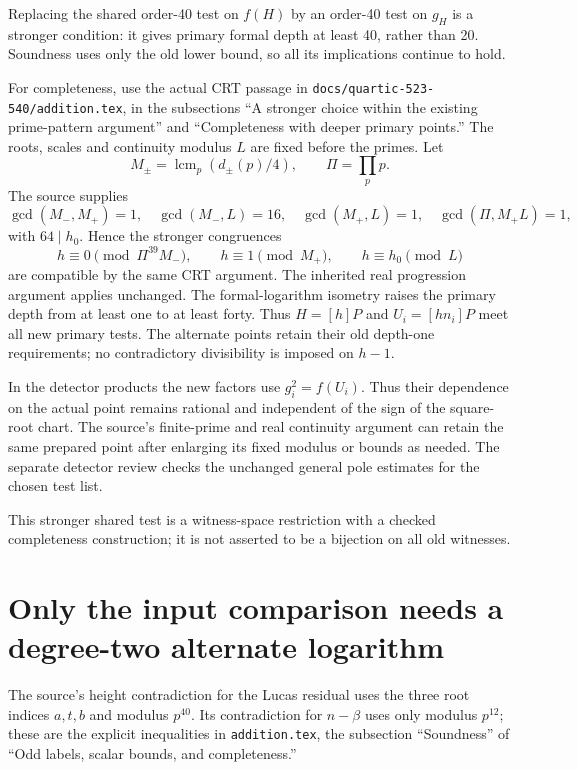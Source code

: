 Replacing the shared order-40 test on $f(H)$ by an order-40 test on
$g_H$ is a stronger condition: it gives primary formal depth at least
40, rather than 20.  Soundness uses only the old lower bound, so all its
implications continue to hold.

For completeness, use the actual CRT passage in
\texttt{docs/quartic-523-540/addition.tex}, in the subsections
``A stronger choice within the existing prime-pattern argument'' and
``Completeness with deeper primary points.''  The roots, scales and
continuity modulus $L$ are fixed before the primes.  Let
\[
 M_\pm=\operatorname{lcm}_p(d_\pm(p)/4),\qquad \Pi=\prod_p p.
\]
The source supplies
\[
 \gcd(M_-,M_+)=1,\quad \gcd(M_-,L)=16,\quad
 \gcd(M_+,L)=1,\quad \gcd(\Pi,M_+L)=1,
\]
with $64\mid h_0$.  Hence the stronger congruences
\[
 h\equiv0\pmod{\Pi^{39}M_-},\qquad
 h\equiv1\pmod{M_+},\qquad h\equiv h_0\pmod L
\]
are compatible by the same CRT argument.  The inherited real progression
argument applies unchanged.  The formal-logarithm isometry raises the
primary depth from at least one to at least forty.  Thus $H=[h]P$ and
$U_i=[hn_i]P$ meet all new primary tests.  The alternate points retain
their old depth-one requirements; no contradictory divisibility is
imposed on $h-1$.

In the detector products the new factors use $g_i^2=f(U_i)$.
Thus their dependence on the actual point remains rational and
independent of the sign of the square-root chart.  The source's finite-prime
and real continuity argument can retain the same prepared point after
enlarging its fixed modulus or bounds as needed.  The separate detector
review checks the unchanged general pole estimates for the chosen test list.

This stronger shared test is a witness-space restriction with a checked
completeness construction; it is not asserted to be a bijection on all
old witnesses.

\section{Only the input comparison needs a degree-two alternate logarithm}

The source's height contradiction for the Lucas residual uses the three
root indices $a,t,b$ and modulus $p^{40}$.  Its contradiction for
$n-\beta$ uses only modulus $p^{12}$; these are the explicit inequalities
in \texttt{addition.tex}, the subsection ``Soundness'' of
``Odd labels, scalar bounds, and completeness.''


